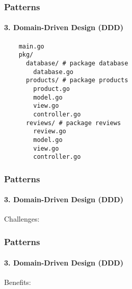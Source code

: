 \begin{frame}[fragile]
  \frametitle{Patterns}
  \framesubtitle{3. Domain-Driven Design (DDD)}

  \begin{verbatim}
    main.go
    pkg/
      database/ # package database
        database.go
      products/ # package products
        product.go
        model.go
        view.go
        controller.go
      reviews/ # package reviews
        review.go
        model.go
        view.go
        controller.go
  \end{verbatim}
\end{frame}

\begin{frame}[fragile]
  \frametitle{Patterns}
  \framesubtitle{3. Domain-Driven Design (DDD)}

  Challenges:
\end{frame}

\begin{frame}[fragile]
  \frametitle{Patterns}
  \framesubtitle{3. Domain-Driven Design (DDD)}

  Benefits:
\end{frame}

